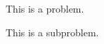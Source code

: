 \documentclass{article}
\begin{document}
\title{}
\author{}
\maketitle
\begin{problem}
    This is a problem.
\end{problem}
\begin{subproblem}
    This is a subproblem.
\end{subproblem}
\end{document}
